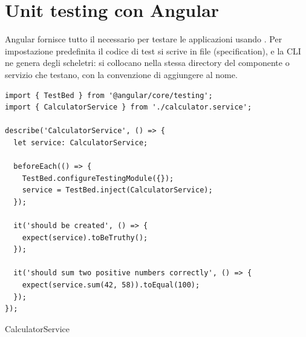 \section{Unit testing con Angular}

Angular fornisce tutto il necessario per testare le applicazioni usando
. Per impostazione predefinita il codice di test si scrive in file
 (specification), e la CLI ne genera degli scheletri: si collocano
nella stessa directory del componente o servizio che testano, con la convenzione
di aggiungere  al nome.

\begin{affianco}[0.46][c]
\codicepiccolo
\begin{lstlisting}[style=ts, name=calculator.service.spec.ts]
import { TestBed } from '@angular/core/testing';
import { CalculatorService } from './calculator.service';

describe('CalculatorService', () => {
  let service: CalculatorService;

  beforeEach(() => {
    TestBed.configureTestingModule({});
    service = TestBed.inject(CalculatorService);
  });

  it('should be created', () => {
    expect(service).toBeTruthy();
  });

  it('should sum two positive numbers correctly', () => {
    expect(service.sum(42, 58)).toEqual(100);
  });
});
\end{lstlisting}
\risultato
\begin{browser}[Karma]
  {\wtuifont
  \colorbox{green-gradient-6}{}\par\vspace{6pt}
  {\color{neutral!25!black}CalculatorService}\par\vspace{2pt}
  \par
  \par}
\end{browser}
\end{affianco}

